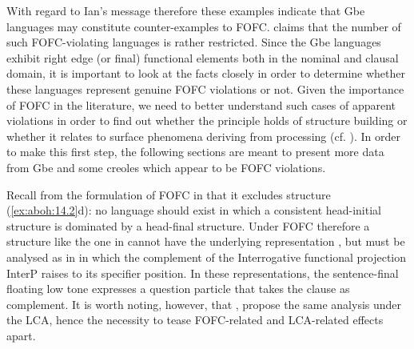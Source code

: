 \documentclass[output=paper]{langsci/langscibook}
\begin{document}
With regard to Ian’s message therefore these examples indicate that Gbe
languages may constitute counter-examples to FOFC. \citet{Sheehan2013} claims
that the number of such FOFC-violating languages is rather restricted. Since
the Gbe languages exhibit right edge (or final) functional elements both in the
nominal and clausal domain, it is important to look at the facts closely in
order to determine whether these languages represent genuine \gls{FOFC} violations or
not. Given the importance of \gls{FOFC} in the literature, we need to better
understand such cases of apparent violations in order to find out whether the
principle holds of structure building or whether it relates to surface
phenomena deriving from processing (cf.
\citealt{hawkins83,Hawkins1990,Walkden2009}). In order to make this first step,
the following sections are meant to present more data from Gbe and some creoles
which appear to be \gls{FOFC} violations.

Recall from the formulation of \gls{FOFC} in  that it excludes
structure (\ref{ex:aboh:14.2}d): no language should exist in which a consistent head-initial
structure is dominated by a head-final structure. Under \gls{FOFC} therefore a
structure like the one in  cannot have the underlying
representation , but must be analysed as in
 in which the complement of the Interrogative functional
projection InterP raises to its specifier position. In these representations,
the sentence-final floating low tone expresses a question particle that takes
the clause as complement. It is worth noting, however, that \citet{Aboh2004a},
\citet{AbohPfau2011} propose the same analysis under the \gls{LCA}, hence the
necessity to tease FOFC-related and LCA-related effects apart.
\end{document}
